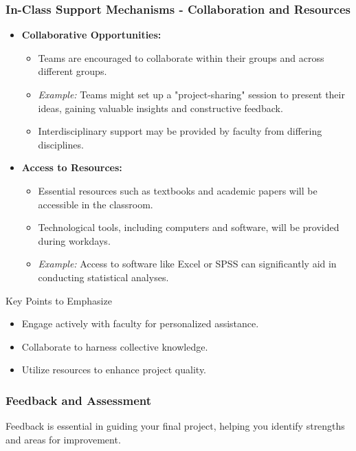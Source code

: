 \documentclass[aspectratio=169]{beamer}
\begin{document}
\begin{frame}[fragile]
    \frametitle{In-Class Support Mechanisms - Collaboration and Resources}
    \begin{itemize}
        \item \textbf{Collaborative Opportunities:}
            \begin{itemize}
                \item Teams are encouraged to collaborate within their groups and across different groups.
                \item \textit{Example:} Teams might set up a "project-sharing" session to present their ideas, gaining valuable insights and constructive feedback.
                \item Interdisciplinary support may be provided by faculty from differing disciplines.
            \end{itemize}

        \item \textbf{Access to Resources:}
            \begin{itemize}
                \item Essential resources such as textbooks and academic papers will be accessible in the classroom.
                \item Technological tools, including computers and software, will be provided during workdays.
                \item \textit{Example:} Access to software like Excel or SPSS can significantly aid in conducting statistical analyses.
            \end{itemize}
    \end{itemize}

    \begin{block}{Key Points to Emphasize}
        \begin{itemize}
            \item Engage actively with faculty for personalized assistance.
            \item Collaborate to harness collective knowledge.
            \item Utilize resources to enhance project quality.
        \end{itemize}
    \end{block}
\end{frame}

\begin{frame}[fragile]
    \frametitle{Feedback and Assessment}
    Feedback is essential in guiding your final project, helping you identify strengths and areas for improvement.
\end{frame}
\end{document}

